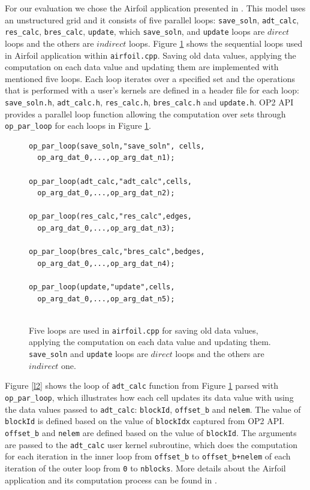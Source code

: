 \documentclass[conference]{IEEEtran}
\begin{document}
For our evaluation we chose the Airfoil application presented in \cite{o8}. This model uses an unstructured grid and it consists of five parallel loops: \texttt{save\_soln}, \texttt{adt\_calc}, \texttt{res\_calc}, \texttt{bres\_calc}, \texttt{update}, which \texttt{save\_soln},  and \texttt{update} loops are $direct$ loops and the others are $indirect$ loops. Figure \ref{l1} shows the sequential loops used in Airfoil application within \texttt{airfoil.cpp}. Saving old data values, applying the computation on each data value and updating them are implemented with mentioned five loops. Each loop iterates over a specified set and the operations that is performed with a user's kernels are defined in a header file for each loop: \texttt{save\_soln.h}, \texttt{adt\_calc.h}, \texttt{res\_calc.h}, \texttt{bres\_calc.h} and \texttt{update.h}.  OP2 API provides a parallel loop function allowing the computation over sets through \texttt{op\_par\_loop} for each loops in Figure \ref{l1}. 

\begin{figure} [!h]
    \begin{lstlisting}
op_par_loop(save_soln,"save_soln", cells,
  op_arg_dat_0,...,op_arg_dat_n1);
  
op_par_loop(adt_calc,"adt_calc",cells,
  op_arg_dat_0,...,op_arg_dat_n2);
  
op_par_loop(res_calc,"res_calc",edges,
  op_arg_dat_0,...,op_arg_dat_n3);

op_par_loop(bres_calc,"bres_calc",bedges,
  op_arg_dat_0,...,op_arg_dat_n4);
  
op_par_loop(update,"update",cells,
  op_arg_dat_0,...,op_arg_dat_n5);
  
    \end{lstlisting}
    \caption{\small{Five loops are used in \texttt{airfoil.cpp} for saving old data values, applying the computation on each data value and updating them. \texttt{save\_soln} and \texttt{update} loops are $direct$ loops and the others are $indirect$ one.}}
    \label{l1}
\end{figure}


Figure \ref{l2} shows the loop of \texttt{adt\_calc} function from Figure \ref{l1} parsed with \texttt{op\_par\_loop}, which illustrates how each cell updates its data value with using the data values passed to \texttt{adt\_calc}: \texttt{blockId}, \texttt{offset\_b} and \texttt{nelem}. The value of \texttt{blockId} is defined based on the value of \texttt{blockIdx} captured from OP2 API.  \texttt{offset\_b} and \texttt{nelem} are defined based on the value of \texttt{blockId}. The arguments are passed to the \texttt{adt\_calc} user kernel subroutine, which does the computation for each iteration in the inner loop from \texttt{offset\_b} to \texttt{offset\_b+nelem} of each iteration of the outer loop from \texttt{0} to \texttt{nblocks}. More details about the Airfoil application and its computation process can be found in \cite{o8}.
\end{document}

